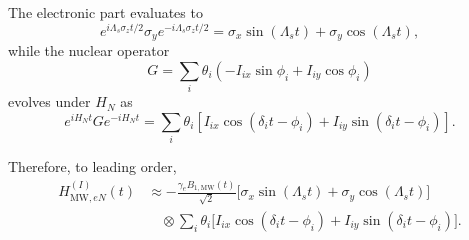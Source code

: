 The electronic part evaluates to
\[
e^{i\Lambda_s\sigma_z t/2}
\sigma_y
e^{-i\Lambda_s\sigma_z t/2}
=
\sigma_x\sin(\Lambda_s t)
+
\sigma_y\cos(\Lambda_s t),
\]
while the nuclear operator
\[
G
=
\sum_i\theta_i
\left(
-I_{ix}\sin\phi_i
+
I_{iy}\cos\phi_i
\right)
\]
evolves under \(H_N\) as
\[
e^{iH_N t}
G
e^{-iH_N t}
=
\sum_i\theta_i
\left[
I_{ix}\cos(\delta_i t-\phi_i)
+
I_{iy}\sin(\delta_i t-\phi_i)
\right].
\]

Therefore, to leading order,
\begin{equation}
\begin{aligned}
H_{\mathrm{MW},eN}^{(I)}(t)
&\approx
-\frac{\gamma_e B_{1,\mathrm{MW}}(t)}{\sqrt2}
\big[
\sigma_x\sin(\Lambda_s t)
+
\sigma_y\cos(\Lambda_s t)
\big]
\\
&\quad\otimes
\sum_i\theta_i
\big[
I_{ix}\cos(\delta_i t-\phi_i)
+
I_{iy}\sin(\delta_i t-\phi_i)
\big].
\end{aligned}
\label{eq:HeN_I}
\end{equation}


